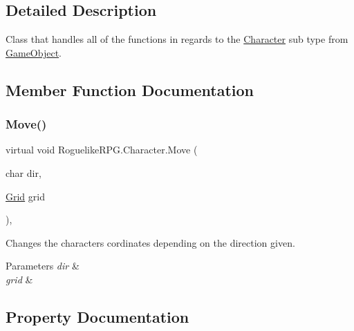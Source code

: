 \subsection{Detailed Description}
Class that handles all of the functions in regards to the \mbox{\hyperlink{class_roguelike_r_p_g_1_1_character}{Character}} sub type from \mbox{\hyperlink{class_roguelike_r_p_g_1_1_game_object}{Game\+Object}}. 



\subsection{Member Function Documentation}
\mbox{\label{class_roguelike_r_p_g_1_1_character_a9b78a6de5cabe2c59d0b965733d9d63b}} 
\subsubsection{\texorpdfstring{Move()}{Move()}}
{\footnotesize\ttfamily virtual void Roguelike\+R\+P\+G.\+Character.\+Move (\begin{DoxyParamCaption}\item[{char}]{dir,  }\item[{\mbox{\hyperlink{class_roguelike_r_p_g_1_1_grid}{Grid}}}]{grid }\end{DoxyParamCaption})\hspace{0.3cm}{\ttfamily [inline]}, {\ttfamily [virtual]}}



Changes the characters cordinates depending on the direction given. 


\begin{DoxyParams}{Parameters}
{\em dir} & \\
\hline
{\em grid} & \\
\hline
\end{DoxyParams}


\subsection{Property Documentation}
\mbox{\label{class_roguelike_r_p_g_1_1_character_a9d6a6a907e8d26c967218e7cf5ea02c7}} 
